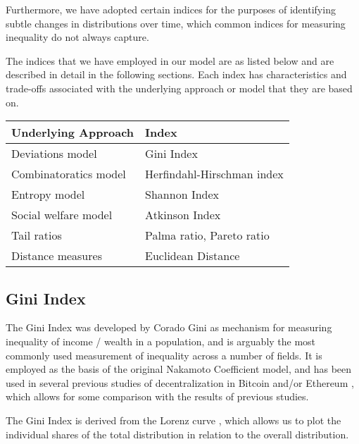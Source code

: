 \documentclass[conference]{IEEEtran}
\begin{document}
Furthermore, we have adopted certain indices for the purposes of identifying subtle changes in distributions over time, which common indices for measuring inequality do not always capture.

The indices that we have employed in our model are as listed below and are described in detail in the following sections.  Each index has characteristics and trade-offs associated with the underlying approach or model that they are based on.

\vspace{12pt}

\begin{center}
\begin{tabular}{|l|l|}
\hline
\textbf{Underlying Approach} & \textbf{Index} \\ \hline
Deviations model & Gini Index \\ \hline
Combinatoratics model & Herfindahl-Hirschman index \\ \hline
Entropy model & Shannon Index \\ \hline
Social welfare model & Atkinson Index \\ \hline
Tail ratios & Palma ratio, Pareto ratio \\ \hline
Distance measures & Euclidean Distance \\ \hline
\end{tabular}
\end{center}

\vspace{12pt}

\subsection{Gini Index}

The Gini Index was developed by Corado Gini \cite{gini1936measure} as mechanism for measuring inequality of income / wealth in a population, and is arguably the most commonly used measurement of inequality across a number of fields.   It is employed as the basis of the original Nakamoto Coefficient model, and has been used in several previous studies of decentralization in Bitcoin and/or Ethereum  \cite{sai2021characterizing, lee2021dq, gupta2018gini, kusmierz2022centralized, kwon2019impossibility, cong2023inclusion, gochhayat2020measuring, karakostas2022sok, zhang2022sok, campajola2022evolution}, which allows for some comparison with the results of previous studies.

The Gini Index is derived from the Lorenz curve \cite{lorenz1905methods}, which allows us to plot the individual shares of the total distribution in relation to the overall distribution.
\end{document}
